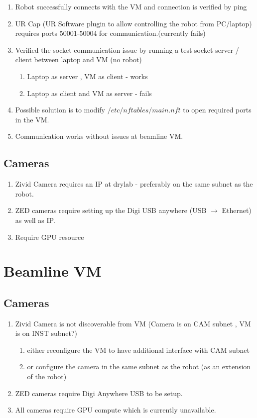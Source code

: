 \documentclass[12pt, a4paper]{article}
\begin{document}
\begin{enumerate}
  \item Robot successfully connects with the VM and connection is verified by ping 
  \item UR Cap (UR Software plugin to allow controlling the robot from PC/laptop) requires ports 50001-50004 for communication.(currently fails)
  \item Verified the socket communication issue by running a test socket server / client between laptop and VM (no robot)
  \begin{enumerate}
    \item Laptop as server , VM as client - works \textcolor{green!60!black}{}
    \item Laptop as client and VM as server - fails \textcolor{red!70!black}{}
  \end{enumerate}
  \item  Possible solution is to modify $/etc/nftables/main.nft$ to open required ports in the VM.
  \item Communication works without issues at beamline VM.
\end{enumerate}

\subsection{Cameras}
\begin{enumerate}
  \item Zivid Camera requires an IP at drylab - preferably on the same subnet as the robot.
  \item ZED cameras require setting up the Digi USB anywhere (USB $\rightarrow$ Ethernet) as well as IP. 
  \item Require GPU resource 
\end{enumerate}

\section{Beamline VM}
\subsection{Cameras}
\begin{enumerate}
  \item Zivid Camera is not discoverable from VM (Camera is on CAM subnet , VM is on INST subnet?)
  \begin{enumerate}
    \item either reconfigure the VM to have additional interface with CAM subnet
    \item or configure the camera in the same subnet as the robot (as an extension of the robot)
  \end{enumerate}
  \item ZED cameras require Digi Anywhere USB to be setup.
  \item All cameras require GPU compute which is currently unavailable.
\end{enumerate}
\end{document}
